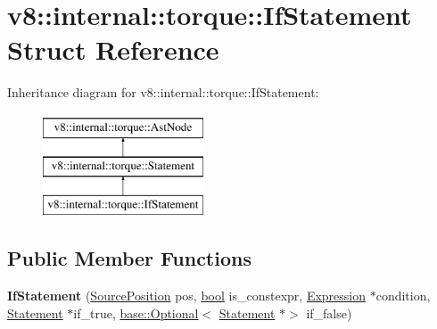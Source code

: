 \hypertarget{structv8_1_1internal_1_1torque_1_1IfStatement}{}\section{v8\+:\+:internal\+:\+:torque\+:\+:If\+Statement Struct Reference}
\label{structv8_1_1internal_1_1torque_1_1IfStatement}
Inheritance diagram for v8\+:\+:internal\+:\+:torque\+:\+:If\+Statement\+:\begin{figure}[H]
\begin{center}
\leavevmode
\includegraphics[height=3.000000cm]{structv8_1_1internal_1_1torque_1_1IfStatement}
\end{center}
\end{figure}
\subsection*{Public Member Functions}
\begin{DoxyCompactItemize}
\item 
\mbox{\label{structv8_1_1internal_1_1torque_1_1IfStatement_aff360c27562a63fa36b63acccd4e023c}} 
{\bfseries If\+Statement} (\mbox{\hyperlink{structv8_1_1internal_1_1torque_1_1SourcePosition}{Source\+Position}} pos, \mbox{\hyperlink{classbool}{bool}} is\+\_\+constexpr, \mbox{\hyperlink{structv8_1_1internal_1_1torque_1_1Expression}{Expression}} $\ast$condition, \mbox{\hyperlink{structv8_1_1internal_1_1torque_1_1Statement}{Statement}} $\ast$if\+\_\+true, \mbox{\hyperlink{classv8_1_1base_1_1Optional}{base\+::\+Optional}}$<$ \mbox{\hyperlink{structv8_1_1internal_1_1torque_1_1Statement}{Statement}} $\ast$$>$ if\+\_\+false)
\end{DoxyCompactItemize}
